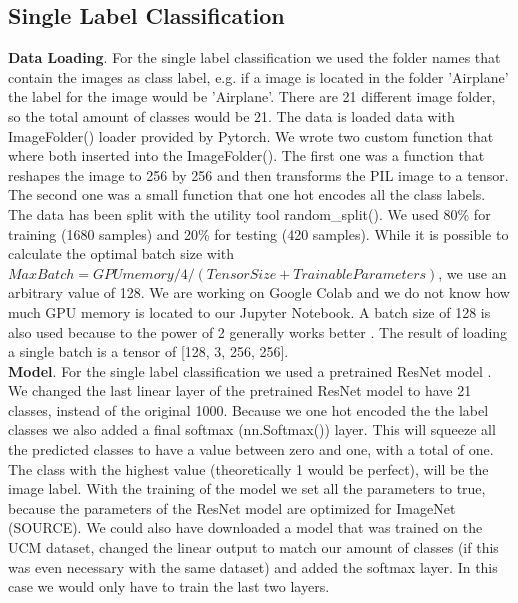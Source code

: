 \documentclass{article}
\begin{document}
\subsection{Single Label Classification}
\textbf{Data Loading}.
For the single label classification we used the folder names that contain the images as class label, e.g. if a image is located in the folder 'Airplane' the label for the image would be 'Airplane'.
There are 21 different image folder, so the total amount of classes would be 21.
The data is loaded data with ImageFolder() loader provided by Pytorch.
We wrote two custom function that where both inserted into the ImageFolder().
The first one was a function that reshapes the image to 256 by 256 and then transforms the PIL image to a tensor.
The second one was a small function that one hot encodes all the class labels. 
The data has been split with the utility tool random\_split().
We used 80\% for training (1680 samples) and 20\% for testing (420 samples).
While it is possible to calculate the optimal batch size with \(Max Batch = GPU memory  / 4 / (Tensor Size + Trainable Parameters)\), we use an arbitrary value of 128.
We are working on Google Colab and we do not know how much GPU memory is located to our Jupyter Notebook.
A batch size of 128 is also used because to the power of 2 generally works better \citep{DBLP:journals/corr/KeskarMNST16}.
The result of loading a single batch is a tensor of [128, 3, 256, 256].
\\ %

\noindent
\textbf{Model}. 
For the single label classification we used a pretrained ResNet model \citep{he2016deep}. 
We changed the last linear layer of the pretrained ResNet model to have 21 classes, instead of the original 1000.
Because we one hot encoded the the label classes we also added a final softmax (nn.Softmax()) layer.
This will squeeze all the predicted classes to have a value between zero and one, with a total of one.
The class with the highest value (theoretically 1 would be perfect), will be the image label.
With the training of the model we set all the parameters to true, because the parameters of the ResNet model are optimized for ImageNet (SOURCE).
We could also have downloaded a model that was trained on the UCM dataset, changed the linear output to match our amount of classes (if this was even necessary with the same dataset) and added the softmax layer.
In this case we would only have to train the last two layers.
\end{document}
